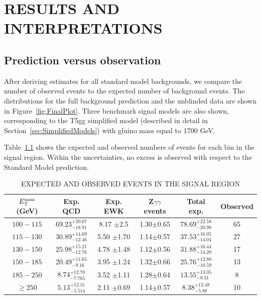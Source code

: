 \chapter{RESULTS AND INTERPRETATIONS}
\label{chap:Results}


\section{Prediction versus observation}
\label{sec:fullCount}
After deriving estimates for all standard model backgrounds, we compare the number of 
observed events to the expected number of background events. 
The \ETmiss distributions for the full background prediction and the unblinded data are
shown in Figure~\ref{fig:FinalPlot}. Three benchmark signal models are also shown, 
corresponding to the T5gg simplified model 
(described in detail in Section~\ref{sec:SimplifiedModels}) with gluino mass equal to 1700 GeV.

Table~\ref{tab:ExpObs} shows the expected and observed numbers of events for each bin in the signal region.
Within the uncertainties, no excess is observed with respect to the Standard Model prediction.


\begin{table}[ht]
    \caption{EXPECTED AND OBSERVED EVENTS IN THE SIGNAL REGION}
    \centering
    \begin{tabular}{ |c|c|c|c|c|c|}
        \hline
        $E_{\mathrm{T}}^{\text{miss}}$ (GeV) & Exp. QCD & Exp. EWK &  Z$\gamma\gamma$ events  &Total exp. & Observed \\ [0.5ex]
        \hline
        $100 - 115$ & ${69.23}^{+20.67}_{-18.91}$ & 8.17 $\pm$2.5  & 1.30$\pm$0.65 & ${ 78.69 }^{+ 22.58 }_{- 20.98 }$ & 65  \\
        $115 - 130$ & ${30.89}^{+14.69}_{-12.46}$ & 5.50 $\pm$1.70 & 1.14$\pm$0.57 & ${ 37.53 }^{+ 16.05 }_{- 14.04 }$ & 27 \\
        $130 - 150$ & ${25.98}^{+15.21}_{-12.76}$ & 4.78 $\pm$1.48 & 1.12$\pm$0.56 & ${ 31.88 }^{+ 16.44 }_{- 14.20 }$ & 17 \\
        $150 - 185$ & ${20.49}^{+11.65}_{-9.16} $ & 3.95 $\pm$1.24 & 1.32$\pm$0.66 & ${ 25.76 }^{+ 12.80 }_{- 10.59 }$ & 13 \\
        $185 -  250$& ${8.74} ^{+12.70}_{-7.765}$ & 3.52 $\pm$1.11 & 1.28$\pm$0.64 & ${ 13.55 }^{+ 13.05 }_{- 8.31  }$ & 8  \\
        $\geq 250$  & ${5.13} ^{+12.31}_{-5.514}$ & 2.11 $\pm$0.69 & 1.14$\pm$0.57 & ${ 8.38  }^{+ 12.48 }_{- 5.88  }$ & 10 \\
        \hline
    \end{tabular}
    \label{tab:ExpObs}
\end{table}

